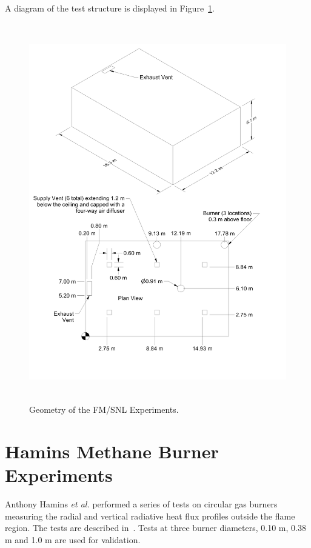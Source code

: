 A diagram of the test structure is displayed in Figure~\ref{FM_SNL_Drawing}.

\begin{figure}
\begin{center}
\includegraphics[height=6.5in]{FIGURES/FM_SNL/FM_SNL_Drawing}
\end{center}
\caption{Geometry of the FM/SNL Experiments.}
\label{FM_SNL_Drawing}
\end{figure}

\clearpage


\section{Hamins Methane Burner Experiments}

Anthony Hamins {\em et al.} performed a series of tests on circular gas
burners measuring the radial and vertical radiative heat flux profiles
outside the flame region. The tests are described
in~\cite{Hostikka:3}. Tests at three burner diameters, 0.10 m, 0.38 m
and 1.0 m are used for validation.


